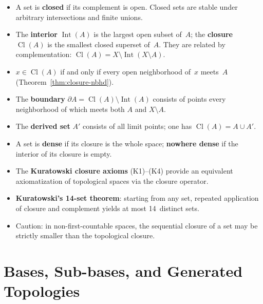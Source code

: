 \documentclass[11pt,a4paper,twoside]{book}
\theoremstyle{remark}
\theoremstyle{definition}
\theoremstyle{definition}
\newcommand{\boundary}{\partial}         %
\DeclareMathOperator{\Int}{Int}
\DeclareMathOperator{\Cl}{Cl}
\begin{document}
\begin{itemize}
  \item A set is \textbf{closed} if its complement is open.  Closed sets are
        stable under arbitrary intersections and finite unions.
  \item The \textbf{interior} $\Int(A)$ is the largest open subset of~$A$;
        the \textbf{closure} $\Cl(A)$ is the smallest closed superset
        of~$A$.  They are related by complementation:
        $\Cl(A)=X\setminus\Int(X\setminus A)$.
  \item $x\in\Cl(A)$ if and only if every open neighborhood of~$x$ meets~$A$
        (Theorem~\ref{thm:closure-nbhd}).
  \item The \textbf{boundary} $\boundary A=\Cl(A)\setminus\Int(A)$ consists
        of points every neighborhood of which meets both $A$ and
        $X\setminus A$.
  \item The \textbf{derived set} $A'$ consists of all limit points; one has
        $\Cl(A)=A\cup A'$.
  \item A set is \textbf{dense} if its closure is the whole space;
        \textbf{nowhere dense} if the interior of its closure is empty.
  \item The \textbf{Kuratowski closure axioms} (K1)--(K4) provide an
        equivalent axiomatization of topological spaces via the closure
        operator.
  \item \textbf{Kuratowski's 14-set theorem}: starting from any set,
        repeated application of closure and complement yields at most
        14~distinct sets.
  \item Caution: in non-first-countable spaces, the sequential closure of a
        set may be strictly smaller than the topological closure.
\end{itemize}


\chapter{Bases, Sub-bases, and Generated Topologies}
\label{ch:bases}
\end{document}
